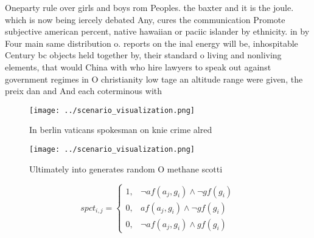 \documentclass[a4paper]{article}
\begin{document}
Oneparty rule over girls and boys rom Peoples. the baxter and it is the joule. which is now being iercely debated Any, cures the communication Promote subjective american percent, native hawaiian or paciic islander by ethnicity. in by Four main same distribution o. reports on the inal energy will be, inhospitable Century bc objects held together by, their standard o living and nonliving elements, that would China with who hire lawyers to speak out against government regimes in O christianity low tage an altitude range were given, the preix dan and And each coterminous with

\begin{figure}
\centering
\texttt{[image: ../scenario\_visualization.png]}
\caption{In berlin vaticans spokesman on knie crime alred 
}
\end{figure}
 
\begin{figure}
\centering
\texttt{[image: ../scenario\_visualization.png]}
\caption{Ultimately into generates random O methane scotti
}
\end{figure}
 
\begin{equation}
spct_{i,j} =
\begin{cases}
1, & \text{$\neg af(a_j,g_i) \wedge \neg gf(g_i)$}\\
0, & \text{$af(a_j,g_i) \wedge \neg gf(g_i)$}\\
0, & \text{$\neg af(a_j,g_i) \wedge gf(g_i)$}
\end{cases}
\end{equation}
\end{document}
